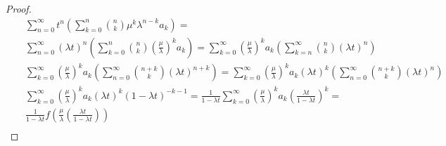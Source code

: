 \documentclass[10pt,a4paper]{amsart}
\begin{document}
\begin{proof}
 \begin{eqnarray*}
  &&\sum_{n=0}^{\infty}t^n\left( \sum_{k=0}^{n}\binom{n}{k}{\mu}^k{\lambda}^{n-k}a_k\right)=\\
&&\sum_{n=0}^{\infty}(\lambda t)^n\left( \sum_{k=0}^{n}\binom{n}{k}(\frac{\mu}{\lambda})^ka_k\right)=
\sum_{k=0}^{\infty}(\frac{\mu}{\lambda})^ka_k\left( \sum_{k=n}^{\infty}
\binom{n}{k}(\lambda t)^n\right)\\
&&\sum_{k=0}^{\infty}(\frac{\mu}{\lambda})^ka_k\left( \sum_{n=0}^{\infty}
\binom{n+k}{k}(\lambda t)^{n+k}\right)=\sum_{k=0}^{\infty}(\frac{\mu}{\lambda})^ka_k(\lambda t)^k\left( \sum_{n=0}^{\infty}\binom{n+k}{k}(\lambda t)^{n}\right)\\
&&\sum_{k=0}^{\infty}(\frac{\mu}{\lambda})^ka_k(\lambda t)^k(1-\lambda t)^{-k-1}=\frac{1}{1-\lambda t}\sum_{k=0}^{\infty}(\frac{\mu}{\lambda})^ka_k\left(\frac{\lambda t}{1-\lambda t}\right)^k=\\
&&\frac{1}{1-\lambda t}f\left(\frac{\mu}{\lambda}\left(\frac{\lambda t}{1-\lambda t}\right)\right)\\
 \end{eqnarray*}
\end{proof}
\end{document}
